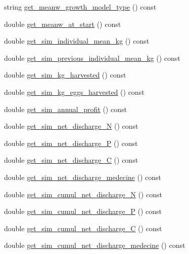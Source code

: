 \begin{DoxyCompactItemize}
string \mbox{\hyperlink{class_fishfarm_a3421db7c915fbde76655ce7b6df0ba2e}{get\+\_\+meanw\+\_\+growth\+\_\+model\+\_\+type}} () const
\item 
double \mbox{\hyperlink{class_fishfarm_ac897666f45d54e4e9afb8a8d9219e642}{get\+\_\+meanw\+\_\+at\+\_\+start}} () const
\item 
double \mbox{\hyperlink{class_fishfarm_a8234993c5d79aaa2001bc5e1aa655d50}{get\+\_\+sim\+\_\+individual\+\_\+mean\+\_\+kg}} () const
\item 
double \mbox{\hyperlink{class_fishfarm_abca6cc794011a8f73bd14aac38d4d917}{get\+\_\+sim\+\_\+previous\+\_\+individual\+\_\+mean\+\_\+kg}} () const
\item 
double \mbox{\hyperlink{class_fishfarm_a214d56e185267a336864f02c1c9629da}{get\+\_\+sim\+\_\+kg\+\_\+harvested}} () const
\item 
double \mbox{\hyperlink{class_fishfarm_a0bd9d174a35d21c9624a20bd273e318f}{get\+\_\+sim\+\_\+kg\+\_\+eggs\+\_\+harvested}} () const
\item 
double \mbox{\hyperlink{class_fishfarm_ae8036540dc9bcf0a9868e903f79c6874}{get\+\_\+sim\+\_\+annual\+\_\+profit}} () const
\item 
double \mbox{\hyperlink{class_fishfarm_af721004d8aa13379b286b814bb4822f5}{get\+\_\+sim\+\_\+net\+\_\+discharge\+\_\+N}} () const
\item 
double \mbox{\hyperlink{class_fishfarm_a89d7d8fa18972ba13b7d2d4d42661c35}{get\+\_\+sim\+\_\+net\+\_\+discharge\+\_\+P}} () const
\item 
double \mbox{\hyperlink{class_fishfarm_a29bf78bd1864f4d6c476d6bcd26466b7}{get\+\_\+sim\+\_\+net\+\_\+discharge\+\_\+C}} () const
\item 
double \mbox{\hyperlink{class_fishfarm_a1e5424c4e5cc685874e138c3cfa85ab9}{get\+\_\+sim\+\_\+net\+\_\+discharge\+\_\+medecine}} () const
\item 
double \mbox{\hyperlink{class_fishfarm_a2263bd93823f16fedf93f16391b2f9ea}{get\+\_\+sim\+\_\+cumul\+\_\+net\+\_\+discharge\+\_\+N}} () const
\item 
double \mbox{\hyperlink{class_fishfarm_a1d59bc456ec95b3758a9b95f4956305a}{get\+\_\+sim\+\_\+cumul\+\_\+net\+\_\+discharge\+\_\+P}} () const
\item 
double \mbox{\hyperlink{class_fishfarm_a7045af628074dfaeb8866500b4c1a5f4}{get\+\_\+sim\+\_\+cumul\+\_\+net\+\_\+discharge\+\_\+C}} () const
\item 
double \mbox{\hyperlink{class_fishfarm_aedfaba1cc436af5bdc7fcfd6efea3461}{get\+\_\+sim\+\_\+cumul\+\_\+net\+\_\+discharge\+\_\+medecine}} () const

\end{DoxyCompactItemize}
